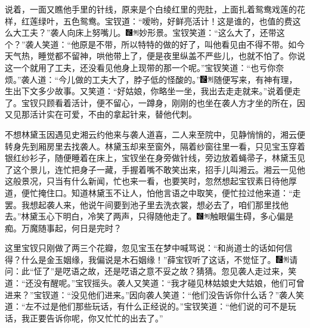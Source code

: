 说着，一面又瞧他手里的针线，原来是个白绫红里的兜肚，上面扎着鸳鸯戏莲的花样，红莲绿叶，五色鸳鸯。宝钗道：``嗳哟，好鲜亮活计！这是谁的，也值的费这么大工夫？''袭人向床上努嘴儿。{\includegraphics[width=3mm]{../Images/00006}\includegraphics[width=3mm]{../Images/00011}\footnotesize \kaishu 妙形景。}宝钗笑道：``这么大了，还带这个？''袭人笑道：``他原是不带，所以特特的做的好了，叫他看见由不得不带。如今天气热，睡觉都不留神，哄他带上了，便是夜里纵盖不严些儿，也就不怕了。你说这一个就用了工夫，还没看见他身上现带的那一个呢。''宝钗笑道：``也亏你奈烦。''袭人道：``今儿做的工夫大了，脖子低的怪酸的。''{\includegraphics[width=3mm]{../Images/00006}\includegraphics[width=3mm]{../Images/00011}\footnotesize \kaishu 随便写来，有神有理，生出下文多少故事。}又笑道：``好姑娘，你略坐一坐，我出去走走就来。''说着便走了。宝钗只顾看着活计，便不留心，一蹲身，刚刚的也坐在袭人方才坐的所在，因又见那活计实在可爱，不由的拿起针来，替他代刺。

不想林黛玉因遇见史湘云约他来与袭人道喜，二人来至院中，见静悄悄的，湘云便转身先到厢房里去找袭人。林黛玉却来至窗外，隔着纱窗往里一看，只见宝玉穿着银红纱衫子，随便睡着在床上，宝钗坐在身旁做针线，旁边放着蝇帚子，林黛玉见了这个景儿，连忙把身子一藏，手握着嘴不敢笑出来，招手儿叫湘云。湘云一见他这般景况，只当有什么新闻，忙也来一看，也要笑时，忽然想起宝钗素日待他厚道，便忙掩住口。知道林黛玉不让人，怕他言语之中取笑，便忙拉过他来道：``走罢。我想起袭人来，他说午间要到池子里去洗衣裳，想必去了，咱们那里找他去。''林黛玉心下明白，冷笑了两声，只得随他走了。{\includegraphics[width=3mm]{../Images/00006}\includegraphics[width=3mm]{../Images/00011}\footnotesize \kaishu 触眼偏生碍，多心偏是痴。万魔随事起，何日是完时？}

这里宝钗只刚做了两三个花瓣，忽见宝玉在梦中喊骂说：``和尚道士的话如何信得？什么是金玉姻缘，我偏说是木石姻缘！''薛宝钗听了这话，不觉怔了。{\includegraphics[width=3mm]{../Images/00006}\includegraphics[width=3mm]{../Images/00011}\footnotesize \kaishu 请问：此``怔了''是呓语之故，还是呓语之意不妥之故？猜猜。}忽见袭人走过来，笑道：``还没有醒呢。''宝钗摇头。袭人又笑道：``我才碰见林姑娘史大姑娘，他们可曾进来？''宝钗道：``没见他们进来。''因向袭人笑道：``他们没告诉你什么话？''袭人笑道：``左不过是他们那些玩话，有什么正经说的。''宝钗笑道：``他们说的可不是玩话，我正要告诉你呢，你又忙忙的出去了。''

